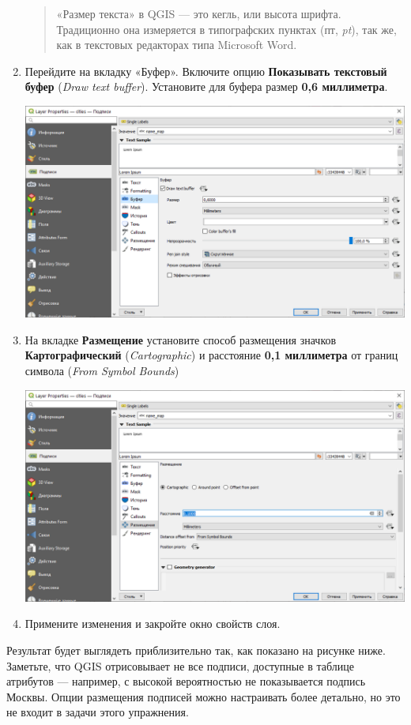 \documentclass[
  12pt,
]{book}
\begin{document}
\begin{enumerate}
  \begin{quote}
  «Размер текста» в QGIS --- это кегль, или высота шрифта. Традиционно она измеряется в типографских пунктах (пт, \emph{pt}), так же, как в текстовых редакторах типа Microsoft Word.
  \end{quote}
\item
  Перейдите на вкладку «Буфер». Включите опцию \textbf{Показывать текстовый буфер} (\emph{Draw text buffer}). Установите для буфера размер \textbf{0,6 миллиметра}.

  \includegraphics{images/Ex03/labels03.png}
\item
  На вкладке \textbf{Размещение} установите способ размещения значков \textbf{Картографический} (\emph{Cartographic}) и расстояние \textbf{0,1 миллиметра} от границ символа (\emph{From Symbol Bounds})

  \includegraphics{images/Ex03/labels04.png}
\item
  Примените изменения и закройте окно свойств слоя.
\end{enumerate}

Результат будет выглядеть приблизительно так, как показано на рисунке ниже. Заметьте, что QGIS отрисовывает не все подписи, доступные в таблице атрибутов --- например, с высокой вероятностью не показывается подпись Москвы. Опции размещения подписей можно настраивать более детально, но это не входит в задачи этого упражнения.
\end{document}
